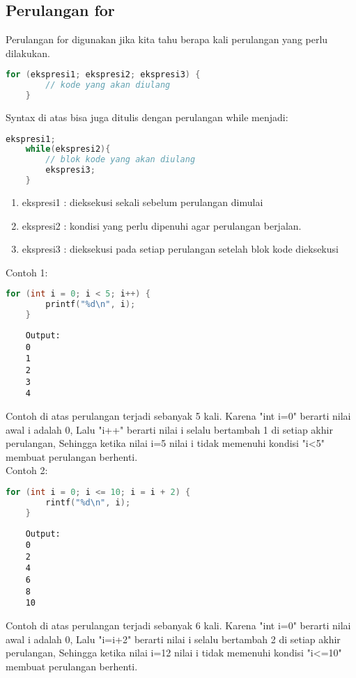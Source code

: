 \subsection{Perulangan for}

Perulangan for digunakan jika kita tahu berapa kali perulangan yang perlu dilakukan.
{
\captionsetup[lstlisting]{labelformat=empty, justification=raggedright, singlelinecheck=false} %
\begin{lstlisting}[language=c, caption={syntax}]
	for (ekspresi1; ekspresi2; ekspresi3) {
		// kode yang akan diulang
	}
\end{lstlisting}
}
Syntax di atas bisa juga ditulis dengan perulangan while menjadi:
{
\captionsetup[lstlisting]{labelformat=empty, justification=raggedright, singlelinecheck=false} %
\begin{lstlisting}[language=c, caption={syntax}]
	ekspresi1;
	while(ekspresi2){
		// blok kode yang akan diulang
		ekspresi3;
	}
\end{lstlisting}
}
\begin{enumerate}[label={}, leftmargin=*]
	\item ekspresi1 : dieksekusi sekali sebelum perulangan dimulai
	\item ekspresi2 : kondisi yang perlu dipenuhi agar perulangan berjalan.
	\item ekspresi3 : dieksekusi pada setiap perulangan setelah blok kode dieksekusi
\end{enumerate}
Contoh 1:
\begin{lstlisting}[language=c]
	for (int i = 0; i < 5; i++) {
		printf("%d\n", i);
	}
\end{lstlisting}
\begin{verbatim}
	Output:
	0
	1
	2
	3
	4
\end{verbatim}
Contoh di atas perulangan terjadi sebanyak 5 kali.
Karena "int i=0" berarti nilai awal i adalah 0,
Lalu "i++" berarti nilai i selalu bertambah 1 di setiap akhir perulangan,
Sehingga ketika nilai i=5 nilai i tidak memenuhi kondisi "i<5" membuat perulangan berhenti.
\\ Contoh 2:
\begin{lstlisting}[language=c]
	for (int i = 0; i <= 10; i = i + 2) {
		rintf("%d\n", i);
	}
\end{lstlisting}
\begin{verbatim}
	Output:
	0
	2
	4
	6
	8
	10
\end{verbatim}
Contoh di atas perulangan terjadi sebanyak 6 kali.
Karena "int i=0" berarti nilai awal i adalah 0,
Lalu "i=i+2" berarti nilai i selalu bertambah 2 di setiap akhir perulangan,
Sehingga ketika nilai i=12 nilai i tidak memenuhi kondisi "i<=10" membuat perulangan berhenti.

